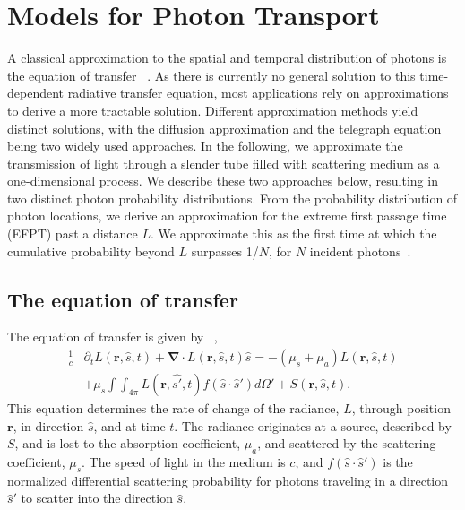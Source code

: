 \section{Models for Photon Transport}\label{sec:predictions}
A classical approximation to the spatial and temporal distribution of photons is the equation of transfer ~\cite{haskell_boundary_1994,ishimaru_wave_1997}. As there is currently no general solution to  this time-dependent radiative transfer equation, most applications rely on approximations to derive a more tractable solution. Different approximation methods yield distinct solutions, with the diffusion approximation and the telegraph equation being two widely used approaches. In the following, we approximate the transmission of light through a slender tube filled with scattering medium as a one-dimensional process. We describe these two approaches below, resulting in two distinct photon probability distributions. From the probability distribution of photon locations, we derive an approximation for the extreme first passage time (EFPT) past a distance $L$. We approximate this as the first time at which the cumulative probability beyond $L$ surpasses 1/$N$, for $N$ incident photons~\cite{hass_first-passage_2024}.

\subsection{The equation of transfer}
The equation of transfer is given by ~\cite{haskell_boundary_1994,ishimaru_wave_1997},
%
\begin{align}
    \frac{1}{c} &\partial_{t} L \left(\mathbf{r},\hat{s},t\right) + \mathbf{\nabla} \cdot L\left(\mathbf{r},\hat{s},t\right)\hat{s} = -\left(\mu_{s} + \mu_{a}\right) L\left(\mathbf{r},\hat{s},t\right) \nonumber \\
    &+ \mu_{s} \int \int_{4\pi} L\left(\mathbf{r},\hat{s'},t\right) f\left(\hat{s} \cdot \hat s'\right) d\Omega' + S\left(\mathbf{r},\hat{s},t\right). \label{eq:RTE}
\end{align}
%
This equation determines the rate of change of the radiance, $L$, through position $\mathbf{r}$, in direction $\hat s$, and at time $t$. The radiance originates at a source, described by $S$, and is lost to the absorption coefficient, $\mu_{a}$, and scattered by the scattering coefficient, $\mu_{s}$. The speed of light in the medium is $c$, and $f(\hat s \cdot \hat s')$ is the normalized differential scattering probability for photons traveling in a direction $\hat s'$ to scatter into the direction $\hat s$. 

